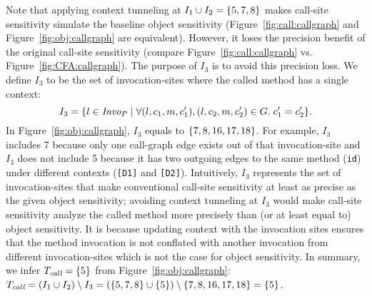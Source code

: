 Note that applying context tunneling at $I_1\cup I_2 = \{ 5,7,8 \}$
makes call-site sensitivity simulate the baseline object
sensitivity (Figure~\ref{fig:call:callgraph} and Figure~\ref{fig:obj:callgraph} are equivalent). However, it loses the precision benefit of the original call-site
sensitivity (compare Figure~\ref{fig:call:callgraph}
vs. Figure~\ref{fig:CFA:callgraph}).
The purpose of $I_3$ is to avoid this precision loss. 
We define $I_3$ to be the set of invocation-sites where the called
  method has a single context:
\[
I_3 = \{ l \in \text{\it Invo}_P \mid \forall (l, c_1, m, c_1'), (l, c_2,
	m, c_2') \in G.\; c_1' = c_2' \}.
\]
In Figure~\ref{fig:obj:callgraph}, $I_3$ equals to $\{ 7, 8, 16,
  17, 18 \}$. For example, $I_3$ includes 7 because only one call-graph
edge exists out of that invocation-site and $I_3$ does not include 5
because it has two outgoing edges to the same method ({\tt id}) under
different contexts ({\tt [D1]} and {\tt [D2]}).
Intuitively, 
$I_3$ represents the set of invocation-sites that make conventional call-site sensitivity %
 at least as precise as the given object sensitivity; avoiding context tunneling at 
$I_3$ would make call-site sensitivity analyze the called method
more precisely than (or at least equal to) object sensitivity.
 It is because updating context with the invocation sites ensures that the method invocation is not conflated with another invocation from different invocation-sites which is not the case for object sensitivity.
In summary, we infer $T_{\text{\it call}} = \{ 5 \}$ from
Figure~\ref{fig:obj:callgraph}: 
 $T_{\text{\it call}} = (I_1 \cup I_2)  \setminus I_3 = (\{ 5,7,8 \} \cup \{ 5 \})
 \setminus \{ 7,8,16,17,18 \}
= \{ 5 \}$. 

